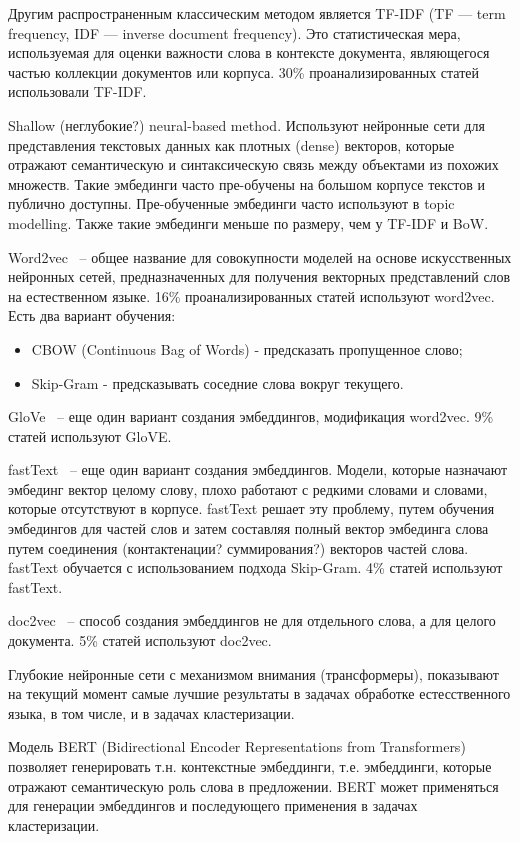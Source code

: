 Другим распространенным классическим методом является TF-IDF (TF — term frequency, IDF — inverse document frequency). Это статистическая мера, используемая для оценки важности слова в контексте документа, являющегося частью коллекции документов или корпуса. 30\% проанализированных статей использовали TF-IDF.

Shallow (неглубокие?) neural-based method. Используют нейронные сети для представления текстовых данных как плотных (dense) векторов, которые отражают семантическую и синтаксическую связь между  объектами из похожих множеств. Такие эмбединги часто пре-обучены на большом корпусе текстов и публично доступны. Пре-обученные эмбединги часто используют в  topic modelling. Также такие эмбединги меньше по размеру, чем у TF-IDF и BoW.

Word2vec ~-- общее название для совокупности моделей на основе искусственных нейронных сетей, предназначенных для получения векторных представлений слов на естественном языке. 16\% проанализированных статей используют word2vec.
Есть два вариант обучения:
\begin{itemize}
    \item CBOW (Continuous Bag of Words) - предсказать пропущенное слово;
    \item Skip-Gram - предсказывать соседние слова вокруг текущего.
\end{itemize}

GloVe ~-- еще один вариант создания эмбеддингов, модификация word2vec. 9\% статей используют GloVE.

fastText ~-- еще один вариант создания эмбеддингов. Модели, которые назначают эмбединг вектор целому слову, плохо работают с редкими словами  и словами, которые отсутствуют в корпусе. fastText решает эту проблему, путем обучения эмбедингов для частей слов и затем составляя полный вектор эмбединга слова путем соединения (контактенации? суммирования?) векторов частей слова. fastText обучается с использованием подхода Skip-Gram. 4\% статей используют fastText.

doc2vec ~-- способ создания эмбеддингов не для отдельного слова, а для целого документа. 5\% статей используют doc2vec.

Глубокие нейронные сети с механизмом внимания (трансформеры), показывают на текущий момент самые лучшие результаты в задачах обработке естесственного языка, в том числе, и в задачах кластеризации.

Модель BERT (Bidirectional Encoder Representations from Transformers) позволяет генерировать т.н. контекстные эмбеддинги, т.е. эмбеддинги, которые отражают семантическую роль слова в предложении. BERT может применяться для генерации эмбеддингов и последующего применения в задачах кластеризации. \cite{text-clustering-with-bert}

